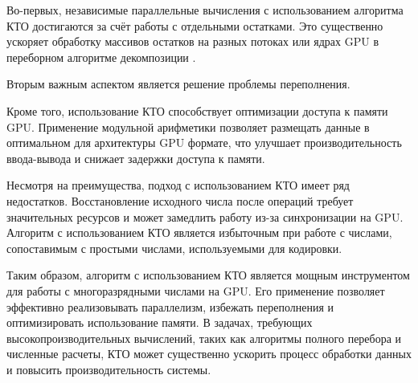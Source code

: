 \documentclass{crm-article}
\begin{document}
Во-первых, независимые параллельные вычисления с использованием алгоритма КТО достигаются за счёт работы с отдельными остатками. Это существенно ускоряет обработку массивов остатков на разных потоках или ядрах GPU в переборном алгоритме декомпозиции \cite{trukhin2025alg}.

Вторым важным аспектом является решение проблемы переполнения.

Кроме того, использование КТО способствует оптимизации доступа к памяти GPU. Применение модульной арифметики позволяет размещать данные в оптимальном для архитектуры GPU формате, что улучшает производительность ввода-вывода и снижает задержки доступа к памяти.

Несмотря на преимущества, подход с использованием КТО имеет ряд недостатков. Восстановление исходного числа после операций требует значительных ресурсов и может замедлить работу из-за синхронизации на GPU. Алгоритм с использованием КТО является избыточным при работе с числами, сопоставимым с простыми числами, используемыми для кодировки.

Таким образом, алгоритм с использованием КТО является мощным инструментом для работы с многоразрядными числами на GPU. Его применение позволяет эффективно реализовывать параллелизм, избежать переполнения и оптимизировать использование памяти. В задачах, требующих высокопроизводительных вычислений, таких как алгоритмы полного перебора и численные расчеты, КТО может существенно ускорить процесс обработки данных и повысить производительность системы.

	
\end{document}
